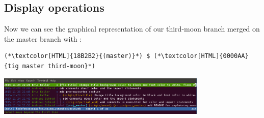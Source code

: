 \subsection{Display operations}
\begin{frame}[fragile]
  \subslidetitle

  Now we can see the graphical representation of our third-moon branch merged on the master branch with :
  \begin{lstlisting}
(*\textcolor[HTML]{18B2B2}{(master)}*) $ (*\textcolor[HTML]{0000AA}{tig master third-moon}*)
\end{lstlisting}

  \vspace{1em}

  \centerline{\includegraphics[width=10cm]{../screen/tig-fix-title-rebase-master.png}}

\end{frame}


